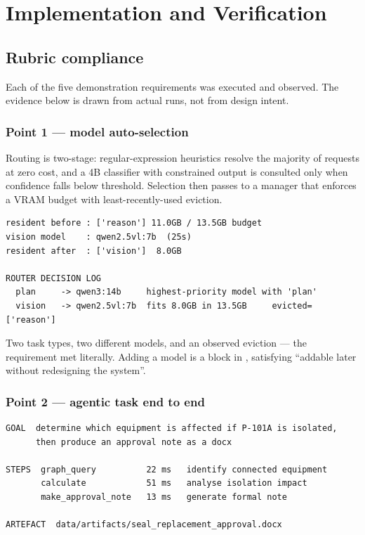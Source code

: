 \section{Implementation and Verification}

\subsection{Rubric compliance}

Each of the five demonstration requirements was executed and observed. The
evidence below is drawn from actual runs, not from design intent.

\subsubsection{Point 1 --- model auto-selection}
\label{sec:router}

Routing is two-stage: regular-expression heuristics resolve the majority of
requests at zero cost, and a 4B classifier with constrained output is consulted
only when confidence falls below threshold. Selection then passes to a manager
that enforces a VRAM budget with least-recently-used eviction.

\begin{lstlisting}
resident before : ['reason'] 11.0GB / 13.5GB budget
vision model    : qwen2.5vl:7b  (25s)
resident after  : ['vision']  8.0GB

ROUTER DECISION LOG
  plan     -> qwen3:14b     highest-priority model with 'plan'
  vision   -> qwen2.5vl:7b  fits 8.0GB in 13.5GB     evicted=['reason']
\end{lstlisting}

\noindent Two task types, two different models, and an observed eviction ---
the requirement met literally. Adding a model is a block in
, satisfying ``addable later without redesigning the
system''.

\subsubsection{Point 2 --- agentic task end to end}
\label{sec:agent}

\begin{lstlisting}
GOAL  determine which equipment is affected if P-101A is isolated,
      then produce an approval note as a docx

STEPS  graph_query          22 ms   identify connected equipment
       calculate            51 ms   analyse isolation impact
       make_approval_note   13 ms   generate formal note

ARTEFACT  data/artifacts/seal_replacement_approval.docx
\end{lstlisting}

